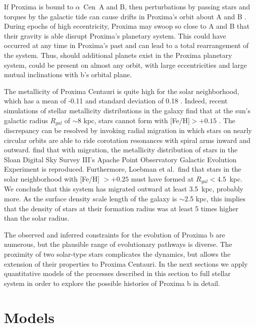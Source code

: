 \documentclass[preprint,12pt]{aastex}
\def\acen{{$\alpha$~Cen}}
\begin{document}
If Proxima is bound to \acen~A and B, then perturbations by passing
stars and torques by the galactic tide can cause drifts in Proxima's
orbit about A and B \citep{Kaib13}. During epochs of high
eccentricity, Proxima may swoop so close to A and B that their gravity
is able disrupt Proxima's planetary system. This could have occurred
at any time in Proxima's past and can lead to a total rearrangement of
the system. Thus, should additional planets exist in the Proxima
planetary system, could be present on almost any orbit, with large
eccentricities and large mutual inclinations with b's orbital plane.

The metallicity of Proxima Centauri is quite high for the solar
neighborhood, which has a mean of -0.11 and standard deviation of 0.18
\citep{AllendePrieto04}. Indeed, recent simulations of stellar
metallicity distributions in the galaxy find that at the sun's
galactic radius $R_{gal}$ of $\sim$8 kpc, stars cannot form with
[Fe/H]$ > +0.15$ \citep{Loebman16}. The discrepancy can be resolved by
invoking radial migration \citep{SellwoodBinney02} in which stars on
nearly circular orbits are able to ride corotation resonances with
spiral arms inward and outward. \cite{Loebman16} find that with
migration, the metallicity distribution of stars in the Sloan Digital
Sky Survey III's Apache Point Observatory Galactic Evolution
Experiment \citep{Hayden15} is reproduced.  Furthermore, Loebman et
al.\ find that stars in the solar neighborhood with [Fe/H] $> +0.25$
must have formed at $R_{gal} < 4.5$~kpc. We conclude that this system
has migrated outward at least 3.5~kpc, probably more. As the surface
density scale length of the galaxy is $\sim$2.5 kpc, this implies that
the density of stars at their formation radius was at least 5 times
higher than the solar radius.

The observed and inferred constraints for the evolution of Proxima b
are numerous, but the plausible range of evolutionary pathways is
diverse. The proximity of two solar-type stars complicates the
dynamics, but allows the extension of their properties to Proxima
Centauri. In the next sections we apply quantitative models of the
processes described in this section to full stellar system in order to
explore the possible histories of Proxima b in detail.


\section{Models\label{sec:models}}
\end{document}
